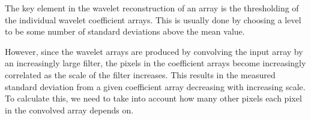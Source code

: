 %
%
%
%
\label{app-scaling}

The key element in the wavelet reconstruction of an array is the
thresholding of the individual wavelet coefficient arrays. This is
usually done by choosing a level to be some number of standard
deviations above the mean value.

However, since the wavelet arrays are produced by convolving the input
array by an increasingly large filter, the pixels in the coefficient
arrays become increasingly correlated as the scale of the filter
increases. This results in the measured standard deviation from a
given coefficient array decreasing with increasing scale. To calculate
this, we need to take into account how many other pixels each pixel in
the convolved array depends on.

